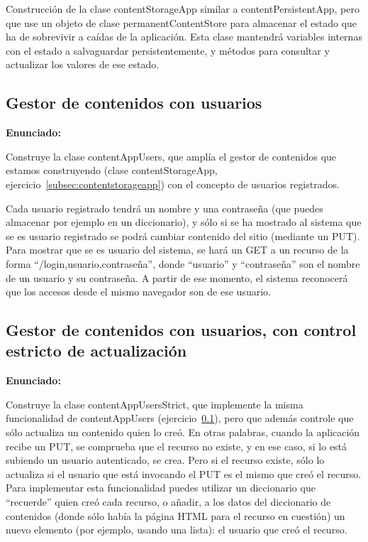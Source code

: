 Construcción de la clase contentStorageApp similar a contentPersistentApp, pero que use un objeto de clase permanentContentStore para almacenar el estado que ha de sobrevivir a caídas de la aplicación. Esta clase mantendrá variables internas con el estado a salvaguardar persistentemente, y métodos para consultar y actualizar los valores de ese estado.

\subsection{Gestor de contenidos con usuarios}
\label{subsec:contentappusers}

\textbf{Enunciado:}

Construye la clase contentAppUsers, que amplía el gestor de contenidos que estamos construyendo (clase contentStorageApp, ejercicio~\ref{subsec:contentstorageapp}) con el concepto de usuarios registrados.

Cada usuario registrado tendrá un nombre y una contraseña (que puedes almacenar por ejemplo en un diccionario), y sólo si se ha mostrado al sistema que se es usuario registrado se podrá cambiar contenido del sitio (mediante un PUT). Para mostrar que se es usuario del sistema, se hará un GET a un recurso de la forma ``/login,usuario,contraseña'', donde ``usuario'' y ``contraseña'' son el nombre de un usuario y su contraseña. A partir de ese momento, el sistema reconocerá que los accesos desde el mismo navegador son de ese usuario. 

\subsection{Gestor de contenidos con usuarios, con control estricto de actualización}
\label{subsec:contentappusersstrict}

\textbf{Enunciado:}

Construye la clase contentAppUsersStrict, que implemente la misma funcionalidad de contentAppUsers (ejercicio~\ref{subsec:contentappusers}), pero que además controle que sólo actualiza un contenido quien lo creó. En otras palabras, cuando la aplicación recibe un PUT, se comprueba que el recurso no existe, y en ese caso, si lo está subiendo un usuario autenticado, se crea. Pero si el recurso existe, sólo lo actualiza si el usuario que está invocando el PUT es el mismo que creó el recurso. Para implementar esta funcionalidad puedes utilizar un diccionario que ``recuerde'' quien creó cada recurso, o añadir, a los datos del diccionario de contenidos (donde sólo había la página HTML para el recurso en cuestión) un nuevo elemento (por ejemplo, usando una lista): el usuario que creó el recurso.


